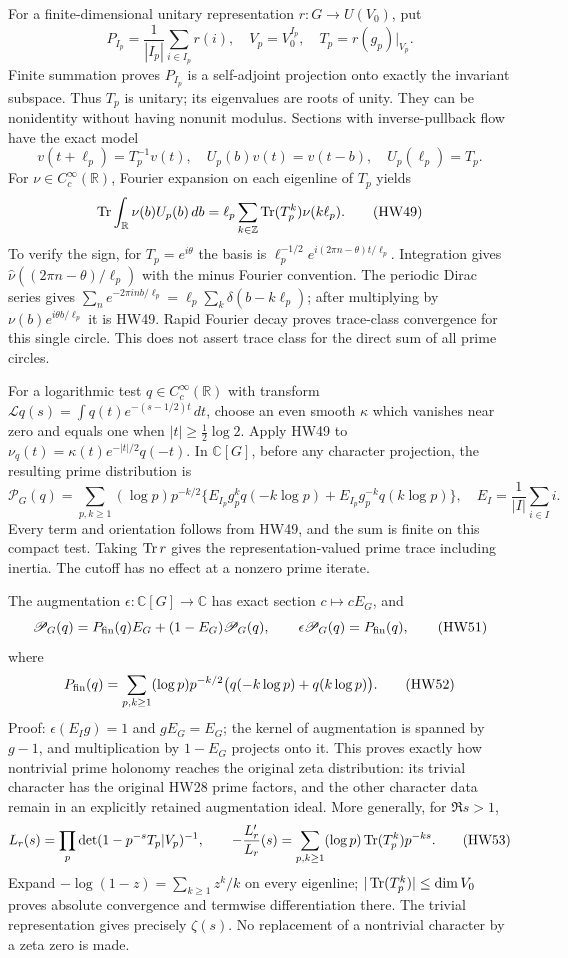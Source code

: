 \documentclass[11pt,a4paper]{article}
\theoremstyle{definition}\newtheorem{definition}[theorem]{Definition}
\newcommand{\Z}{\mathbb Z}\newcommand{\Q}{\mathbb Q}
\newcommand{\C}{\mathbb C}\newcommand{\R}{\mathbb R}
\begin{document}
For a finite-dimensional unitary representation \(r:G\to U(V_0)\),
put
\[
 P_{I_p}=\frac1{|I_p|}\sum_{i\in I_p}r(i),\quad
 V_p=V_0^{I_p},\quad T_p=r(g_p)|_{V_p}.
 \tag{HW47}
\]
Finite summation proves \(P_{I_p}\) is a self-adjoint
projection onto exactly the invariant subspace.
Thus \(T_p\) is unitary; its eigenvalues are roots of unity.
They can be nonidentity without having nonunit modulus.
Sections with inverse-pullback flow have the exact model
\[
 v(t+\ell_p)=T_p^{-1}v(t),\quad
 U_p(b)v(t)=v(t-b),\quad U_p(\ell_p)=T_p.
 \tag{HW48}
\]
For \(\nu\in C_c^\infty(\R)\), Fourier expansion on each
eigenline of \(T_p\) yields
\[
 \tr\int_\R\nu(b)U_p(b)\,db
  =\ell_p\sum_{k\in\Z}\tr(T_p^k)\nu(k\ell_p).
 \tag{HW49}
\]
To verify the sign, for \(T_p=e^{i\theta}\) the basis is
\(\ell_p^{-1/2}e^{i(2\pi n-\theta)t/\ell_p}\).
Integration gives \(\widehat\nu((2\pi n-\theta)/\ell_p)\)
with the minus Fourier convention. The periodic Dirac
series gives
\(\sum_n e^{-2\pi inb/\ell_p}
       =\ell_p\sum_k\delta(b-k\ell_p)\);
after multiplying by \(\nu(b)e^{i\theta b/\ell_p}\) it is
HW49. Rapid Fourier decay proves trace-class convergence
for this single circle. This does not assert trace class
for the direct sum of all prime circles.

For a logarithmic test \(q\in C_c^\infty(\R)\) with transform
\(\mathcal Lq(s)=\int q(t)e^{-(s-1/2)t}\,dt\),
choose an even smooth \(\kappa\) which vanishes near zero
and equals one when \(|t|\ge\frac12\log2\).
Apply HW49 to
\(\nu_q(t)=\kappa(t)e^{-|t|/2}q(-t)\).
In \(\C[G]\), before any character projection, the resulting
prime distribution is
\[
 \mathscr P_G(q)=
  \sum_{p,k\ge1}(\log p)p^{-k/2}
    \{E_{I_p}g_p^kq(-k\log p)
          +E_{I_p}g_p^{-k}q(k\log p)\},
 \quad E_I=\frac1{|I|}\sum_{i\in I}i .
 \tag{HW50}\label{hw:groupdistribution}
\]
Every term and orientation follows from HW49, and the sum
is finite on this compact test. Taking \(\operatorname{Tr} r\) gives
the representation-valued prime trace including inertia.
The cutoff has no effect at a nonzero prime iterate.

The augmentation \(\epsilon:\C[G]\to\C\) has exact section
\(c\mapsto cE_G\), and
\[
 \mathscr P_G(q)
 =P_{\rm fin}(q)E_G+(1-E_G)\mathscr P_G(q),\qquad
 \epsilon\mathscr P_G(q)=P_{\rm fin}(q),
 \tag{HW51}
\]
where
\[
 P_{\rm fin}(q)=
 \sum_{p,k\ge1}(\log p)p^{-k/2}
             \bigl(q(-k\log p)+q(k\log p)\bigr).
 \tag{HW52}
\]
Proof: \(\epsilon(E_Ig)=1\) and \(gE_G=E_G\);
the kernel of augmentation is spanned by \(g-1\), and
multiplication by \(1-E_G\) projects onto it.
This proves exactly how nontrivial prime holonomy reaches
the original zeta distribution: its trivial character has
the original HW28 prime factors, and the other character
data remain in an explicitly retained augmentation ideal.
More generally, for \(\Re s>1\),
\[
 L_r(s)=\prod_p\det(1-p^{-s}T_p|V_p)^{-1},\qquad
 -\frac{L_r'}{L_r}(s)
  =\sum_{p,k\ge1}(\log p)\operatorname{Tr}(T_p^k)p^{-ks}.
 \tag{HW53}
\]
Expand \(-\log(1-z)=\sum_{k\ge1}z^k/k\) on every
eigenline; \(|\operatorname{Tr}(T_p^k)|\le\dim V_0\) proves absolute
convergence and termwise differentiation there.
The trivial representation gives precisely \(\zeta(s)\).
No replacement of a nontrivial character by a zeta zero
is made.
\end{document}
